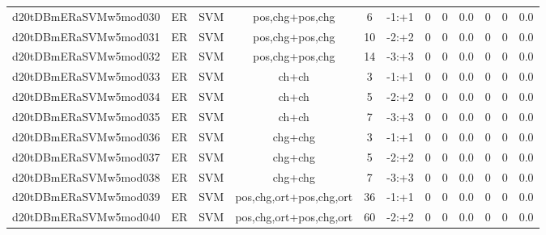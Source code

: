 \documentclass[a4paper]{article}
\begin{document}
\begin{landscape}
\begin{center}
\begin{tabular}{ |c|c|c|c|c|c|c|c|c|c|c|c|}
 	

 
 	
 	\small{ d20tDBmERaSVMw5mod030 } & ER & SVM & pos,chg+pos,chg  &  6 &  -1:+1  &  0 & 0 & 0.0  &  0 & 0 & 0.0 \\
 	

 
 	
 	\small{ d20tDBmERaSVMw5mod031 } & ER & SVM & pos,chg+pos,chg  &  10 &  -2:+2  &  0 & 0 & 0.0  &  0 & 0 & 0.0 \\
 	

 
 	
 	\small{ d20tDBmERaSVMw5mod032 } & ER & SVM & pos,chg+pos,chg  &  14 &  -3:+3  &  0 & 0 & 0.0  &  0 & 0 & 0.0 \\
 	

 
 	
 	\small{ d20tDBmERaSVMw5mod033 } & ER & SVM & ch+ch  &  3 &  -1:+1  &  0 & 0 & 0.0  &  0 & 0 & 0.0 \\
 	

 
 	
 	\small{ d20tDBmERaSVMw5mod034 } & ER & SVM & ch+ch  &  5 &  -2:+2  &  0 & 0 & 0.0  &  0 & 0 & 0.0 \\
 	

 
 	
 	\small{ d20tDBmERaSVMw5mod035 } & ER & SVM & ch+ch  &  7 &  -3:+3  &  0 & 0 & 0.0  &  0 & 0 & 0.0 \\
 	

 
 	
 	\small{ d20tDBmERaSVMw5mod036 } & ER & SVM & chg+chg  &  3 &  -1:+1  &  0 & 0 & 0.0  &  0 & 0 & 0.0 \\
 	

 
 	
 	\small{ d20tDBmERaSVMw5mod037 } & ER & SVM & chg+chg  &  5 &  -2:+2  &  0 & 0 & 0.0  &  0 & 0 & 0.0 \\
 	

 
 	
 	\small{ d20tDBmERaSVMw5mod038 } & ER & SVM & chg+chg  &  7 &  -3:+3  &  0 & 0 & 0.0  &  0 & 0 & 0.0 \\
 	

 
 	
 	\small{ d20tDBmERaSVMw5mod039 } & ER & SVM & pos,chg,ort+pos,chg,ort  &  36 &  -1:+1  &  0 & 0 & 0.0  &  0 & 0 & 0.0 \\
 	

 
 	
 	\small{ d20tDBmERaSVMw5mod040 } & ER & SVM & pos,chg,ort+pos,chg,ort  &  60 &  -2:+2  &  0 & 0 & 0.0  &  0 & 0 & 0.0 \\
 	


\end{tabular}
\end{center}
\end{landscape}
\end{document}
